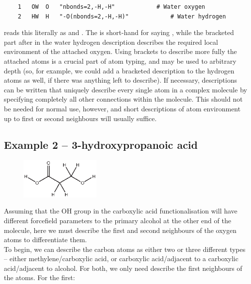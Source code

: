 \begin{verbatim}
    1	OW	O	"nbonds=2,-H,-H"			# Water oxygen
    2	HW	H	"-O(nbonds=2,-H,-H)"			# Water hydrogen
\end{verbatim}

	
\progname{} reads this literally as  and . The  is short-hand for saying , while the bracketed part after  in the water hydrogen description describes the required local environment of the attached oxygen. Using brackets to describe more fully the attached atoms is a crucial part of atom typing, and may be used to arbitrary depth (so, for example, we could add a bracketed description to the hydrogen atoms as well, if there was anything left to describe). If necessary, descriptions can be written that uniquely describe every single atom in a complex molecule by specifying completely all other connections within the molecule. This should not be needed for normal use, however, and short descriptions of atom environment up to first or second neighbours will usually suffice.\\


\subsection{Example 2 -- 3-hydroxypropanoic acid}

\begin{figure} \includegraphics[width=4cm]{figures/propanoic.eps} \end{figure}
Assuming that the OH group in the carboxylic acid functionalisation will have different forcefield parameters to the primary alcohol at the other end of the molecule, here we must describe the first and second neighbours of the oxygen atoms to differentiate them. \\

To begin, we can describe the carbon atoms as either two or three different types -- either methylene/carboxylic acid, or carboxylic acid/adjacent to a carboxylic acid/adjacent to alcohol. For both, we only need describe the first neighbours of the atoms. For the first:


